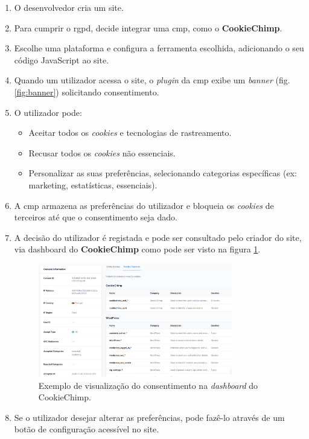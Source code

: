 \begin{enumerate}
    \item O desenvolvedor cria um site.
    \item Para cumprir o \acrshort{rgpd}, decide integrar uma \acrshort{cmp}, como o \textbf{CookieChimp}.
    \item Escolhe uma plataforma e configura a ferramenta escolhida, adicionando o seu código JavaScript ao site.
    \item Quando um utilizador acessa o site, o \textit{plugin} da \acrshort{cmp} exibe um \textit{banner} (fig. \ref{fig:banner}) solicitando consentimento.
    \item O utilizador pode:
          \begin{itemize}
              \item Aceitar todos os \textit{cookies} e tecnologias de rastreamento.
              \item Recusar todos os \textit{cookies} não essenciais.
              \item Personalizar as suas preferências, selecionando categorias específicas (ex: marketing, estatísticas, essenciais).
          \end{itemize}
    \item A \acrshort{cmp} armazena as preferências do utilizador e bloqueia os \textit{cookies} de terceiros até que o consentimento seja dado.
    \item A decisão do utilizador é registada e pode ser consultado pelo criador do site, via dashboard do \textbf{CookieChimp} como pode ser visto na figura \ref{fig:dashboard-visualizacao}.
    \begin{figure}[h]
    \begin{center}
	\includegraphics[width=0.8\textwidth]{images/consent.png}
    \end{center}
    \caption{Exemplo de visualização do consentimento na \textit{dashboard} do CookieChimp.}
    \label{fig:dashboard-visualizacao}
    \end{figure}
    \newpage
    \item Se o utilizador desejar alterar as preferências, pode fazê-lo através de um botão de configuração acessível no site.
\end{enumerate}

